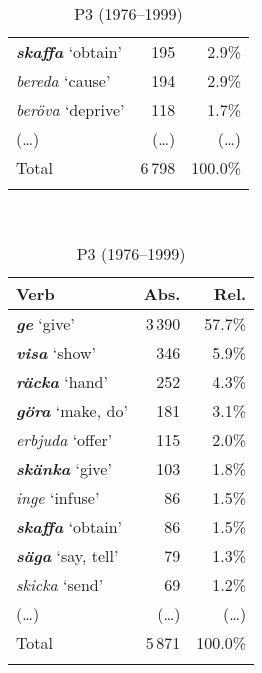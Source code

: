 \documentclass[output=paper]{langscibook}
\begin{document}
\begin{table}
\begin{subtable}{.45\linewidth}
\begin{tabularx}{\linewidth}{Xrr}
 \textbf{\textit{skaffa}} ‘obtain’   & 195 & 2.9\%       \\
 \textit{bereda} ‘cause’            & 194 & 2.9\%        \\
 \textit{beröva} ‘deprive’           & 118 & 1.7\%       \\
(…) & (…) & (…) \\
 \midrule
 Total & 6\,798 & 100.0\%\\
\lspbottomrule
\end{tabularx}
\end{subtable}\medskip\\\begin{subtable}{.5\linewidth}
\caption{P3 (1976–1999)}
\begin{tabularx}{\linewidth}{Xrr}
    \lsptoprule
Verb & Abs.   & Rel.   \\
\midrule
\textbf{\textit{ge}} ‘give’ & 3\,390 & 57.7\%\\
 \textbf{\textit{visa}} ‘show’ & 346 & 5.9\%\\
 \textbf{\textit{räcka}} ‘hand’ & 252 & 4.3\%\\
 \textbf{\textit{göra}} ‘make, do’ & 181 & 3.1\%\\
 \textit{erbjuda} ‘offer’           & 115 & 2.0\%\\
 \textbf{\textit{skänka}} ‘give’ & 103 & 1.8\%\\
 \textit{inge} ‘infuse’ & 86 & 1.5\%\\
 \textbf{\textit{skaffa}} ‘obtain’ & 86 & 1.5\%\\
 \textbf{\textit{säga}} ‘say, tell’ & 79 & 1.3\%\\
 \textit{skicka} ‘send’ & 69 & 1.2\%\\
(…) & (…) & (…) \\
 \midrule
 Total & 5\,871 & 100.0\%\\
\lspbottomrule
\end{tabularx}
\end{subtable}
\end{table}
\end{document}
